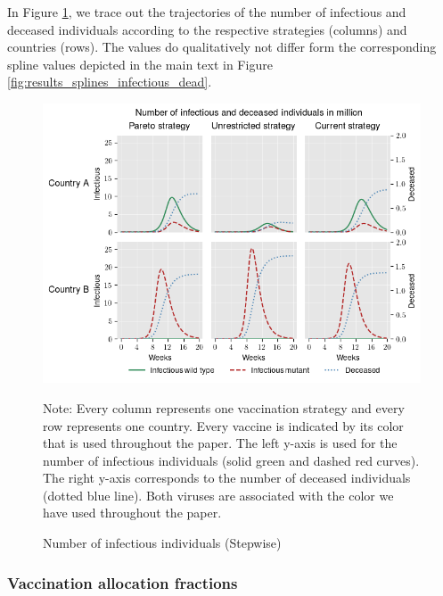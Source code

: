 In Figure \ref{fig:results_piecewise_infectious_dead}, we trace out the trajectories of the number of infectious and deceased individuals according to the respective strategies (columns) and countries (rows). The values do qualitatively not differ form the corresponding spline values depicted in the main text in Figure \ref{fig:results_splines_infectious_dead}.\\

\begin{figure}[h!]
\centering
\includegraphics[scale=0.65]{images/piecewise_infectious_dead.png}\\
\begin{flushleft}
\scriptsize{Note:} Every column represents one vaccination strategy and every row represents one country. Every vaccine is indicated by its color that is used throughout the paper. The left y-axis is used for the number of infectious individuals (solid green and dashed red curves). The right y-axis corresponds to the number of deceased individuals (dotted blue line). Both viruses are associated with the color we have used throughout the paper. 
\end{flushleft}
\caption{Number of infectious individuals (Stepwise)}
\label{fig:results_piecewise_infectious_dead}
\end{figure}

\clearpage
\subsubsection{Vaccination allocation fractions}
\label{A:fractions}

